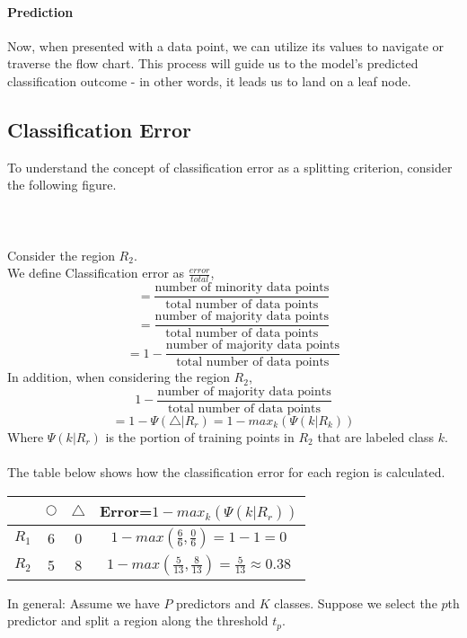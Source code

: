 \documentclass[11pt,a4paper]{report}
\begin{document}
\paragraph{Prediction}Now, when presented with a data point, we can utilize its values to navigate or traverse the flow chart. This process will guide us to the model's predicted classification outcome - in other words, it leads us to land on a leaf node.

\subsection{Classification Error}
To understand the concept of classification error as a splitting criterion, consider the following figure.\\\\
\\\\
Consider the region $R_2$.\\
We define Classification error as $\frac{error}{total}$,
$$=\frac{\textrm{number of minority data points}}{\textrm{total number of data points}}$$
$$=\frac{\textrm{number of majority data points}}{\textrm{total number of data points}}$$
$$=1-\frac{\textrm{number of majority data points}}{\textrm{total number of data points}}$$
In addition, when considering the region $R_2$,
$$1-\frac{\textrm{number of majority data points}}{\textrm{total number of data points}}$$
$$=1-\Psi(\triangle|R_r) = 1 - max_k(\Psi(k|R_k))$$
Where $\Psi(k|R_r)$ is the portion of training points in $R_2$ that are labeled class $k$.\\\\The table below shows how the classification error for each region is calculated.

\begin{center}
\begin{tabular}{ |c|c|c|c| } 
 \hline
  & $\bigcirc$ & $\triangle$ & Error=$1-max_k(\Psi(k|R_r))$\\\hline\hline
 $R_1$ & 6 & 0 & $1 - max(\frac{6}{6}, \frac{0}{6})= 1-1=0$\\\hline
 $R_2$ & 5 & 8 & $1 - max(\frac{5}{13}, \frac{8}{13}) = \frac{5}{13} \approx 0.38$\\\hline
\end{tabular}
\end{center}
In general: Assume we have $P$ predictors and $K$ classes. Suppose we select the $p$th predictor and split a region along the threshold $t_p$.
\end{document}
